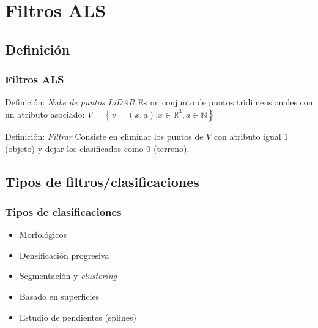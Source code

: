 \section{Filtros ALS}
\subsection{Definición}
\begin{frame}[label=filter_def]
    \frametitle{Filtros ALS}
    \begin{beamerboxesrounded}[shadow=true]{Definición: \emph{Nube de puntos LiDAR}}
     Es un conjunto de puntos tridimensionales con un atributo asociado: $V = \left\lbrace v=\left(x,a\right) | x \in \mathbb{R}^3, a \in \mathbb{N} \right\rbrace$
    \end{beamerboxesrounded}


    \begin{beamerboxesrounded}[shadow=true]{Definición: \emph{Filtrar}}
     Consiste en \alert<4>{eliminar} los puntos de $V$ con atributo igual 1 (objeto) y dejar los clasificados como 0 (terreno).
    \end{beamerboxesrounded}
\end{frame}
\subsection{Tipos de filtros/clasificaciones}
\begin{frame}
    \frametitle{Tipos de clasificaciones}
    \begin{itemize}
        \item Morfológicos
        \item Densificación progresiva
        \item Segmentación y \emph{clustering}
        \item Basado en superficies
        \item Estudio de pendientes (splines)
    \end{itemize}
\end{frame}
